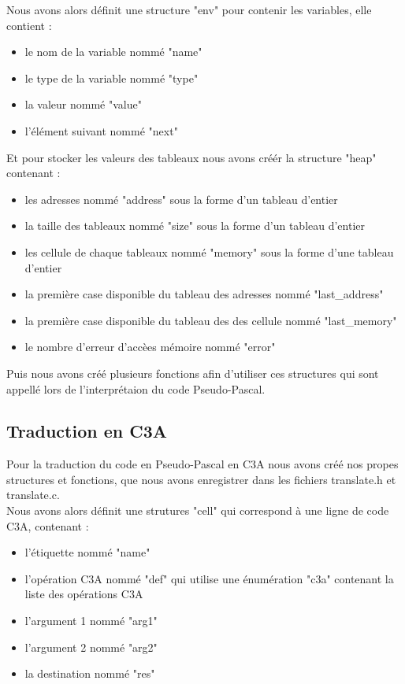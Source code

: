 \documentclass{report}
\begin{document}
Nous avons alors définit une structure "env" pour contenir les variables, elle contient :
\begin{itemize}
\item le nom de la variable nommé "name"
\item le type de la variable nommé "type"
\item la valeur nommé "value"
\item l'élément suivant nommé "next"
\end{itemize}
\bigskip

Et pour stocker les valeurs des tableaux nous avons créér la structure "heap" contenant :
\begin{itemize}
\item les adresses nommé "address" sous la forme d'un tableau d'entier
\item la taille des tableaux nommé "size" sous la forme d'un tableau d'entier
\item les cellule de chaque tableaux nommé "memory" sous la forme d'une tableau d'entier
\item la première case disponible du tableau des adresses nommé "last\_address"
\item la première case disponible du tableau des des cellule nommé "last\_memory"
\item le nombre d'erreur d'accèes mémoire nommé "error"
\end{itemize}
\bigskip

Puis nous avons créé plusieurs fonctions afin d'utiliser ces structures qui sont appellé lors de l'interprétaion du code Pseudo-Pascal.

\subsection{Traduction en C3A}
Pour la traduction du code en Pseudo-Pascal en C3A nous avons créé nos propes structures et fonctions, que nous avons enregistrer dans les fichiers translate.h et translate.c.\\

Nous avons alors définit une strutures "cell" qui correspond à une ligne de code C3A, contenant :
\begin{itemize}
\item l'étiquette nommé "name"
\item l'opération C3A nommé "def" qui utilise une énumération "c3a" contenant la liste des opérations C3A
\item l'argument 1 nommé "arg1"
\item l'argument 2 nommé "arg2"
\item la destination nommé "res"
\end{itemize}
\bigskip
\end{document}
